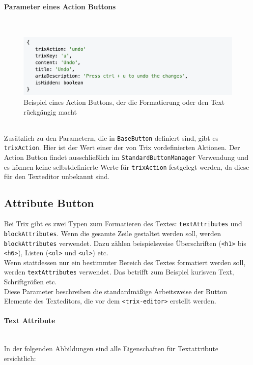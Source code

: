 \paragraph{Parameter eines Action Buttons}\mbox{}\\
\begin{figure}[H]
\begin{center}
	\includegraphics[scale=.7]{images/action-button.png}
\end{center}
	\caption{Beispiel eines Action Buttons, der die Formatierung oder den Text rückgängig macht}
\end{figure}

\mbox{}\\
Zusätzlich zu den Parametern, die in \texttt{BaseButton} definiert sind, gibt es \texttt{trixAction}. Hier ist der Wert einer der von Trix
vordefinierten Aktionen. Der Action Button findet ausschließlich im \texttt{StandardButtonManager} Verwendung und es können
keine selbstdefinierte Werte für \texttt{trixAction} festgelegt werden, da diese für den Texteditor unbekannt sind.

\subsection{Attribute Button}
Bei Trix gibt es zwei Typen zum Formatieren des Textes: \texttt{textAttributes} und \\
\texttt{blockAttributes}. Wenn die gesamte Zeile gestaltet werden soll, werden \\
\texttt{blockAttributes} verwendet. Dazu zählen beispielsweise Überschriften (\texttt{<h1>} bis \texttt{<h6>}), Listen (\texttt{<ol>} 
und \texttt{<ul>}) etc.\\ Wenn stattdessen nur ein bestimmter Bereich des Textes formatiert werden soll, werden 
\texttt{textAttributes} verwendet. Das betrifft zum Beispiel kurisven Text, Schriftgrößen etc.\\
Diese Parameter beschreiben die standardmäßige Arbeitsweise der Button Elemente des Texteditors, die vor dem 
\texttt{<trix-editor>} erstellt werden.

\paragraph{Text Attribute}
\label{paragraph_textAttribute}\mbox{}\\
In der folgenden Abbildungen sind alle Eigenschaften für Textattribute ersichtlich:

